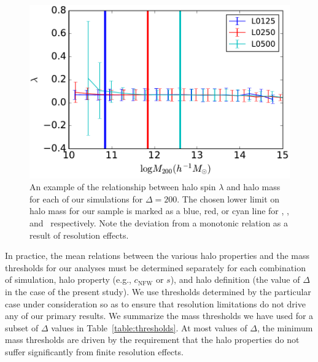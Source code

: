 \documentclass[usenatbib]{mnras}
\begin{document}
\begin{figure}
\centering
\includegraphics[width=.5\textwidth]{masscut_spin_d200.pdf}
\caption{
An example of the relationship between halo spin $\lambda$ 
and halo mass for each of our simulations for $\Delta =200$. 
The chosen lower limit on halo mass for our sample is marked 
as a blue, red, or cyan line for \simA, \simB, and \simC \ respectively. 
Note the deviation from a monotonic relation as a result of resolution effects.
}
\label{fig:spinrelation}
\end{figure}

In practice, the mean relations between the various halo properties and the mass thresholds for our analyses 
must be determined separately for each combination of simulation, 
halo property (e.g., $c_{\mathrm{NFW}}$ or $s$), 
and halo definition (the value of $\Delta$ in the case of the present study). 
We use thresholds determined by the particular case under consideration so as to ensure that
resolution limitations do not drive any of our primary results. 
We summarize the mass thresholds we have used for a 
subset of $\Delta$ values in Table~\ref{table:thresholds}. 
At most values of $\Delta$, the minimum mass thresholds are 
driven by the requirement that the halo properties do 
not suffer significantly from finite resolution effects.
\end{document}
